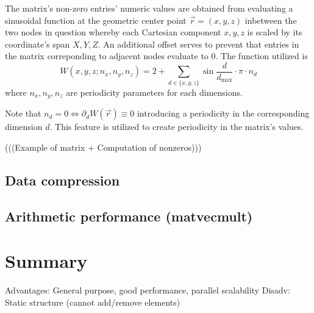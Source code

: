 \documentclass{article}
\begin{document}
    The matrix's non-zero entries' numeric values are obtained from evaluating a sinusoidal function at the geometric
    center point $\vec{r} = (x, y, z)$ inbetween the two nodes in question whereby each Cartesian component $x, y, z$ is
    scaled by its coordinate's span $X, Y, Z$. An additional offset serves to prevent that entries in the matrix
    correponding to adjacent nodes evaluate to 0. The function utilized is
    $$W(x,y,z; n_x, n_y, n_z) = 2 + \sum \limits_{d \in \{x,y,z\}} \sin{\frac{d}{d_{\text{max}}} \cdot \pi \cdot n_d} $$
    where $n_x, n_y, n_z$ are periodicity parameters for each dimensions.

    Note that $n_d = 0 \Leftrightarrow \partial_d W(\vec{r}) \equiv 0$ introducing a periodicity in the corresponding
    dimension $d$. This feature is utilized to create periodicity in the matrix's values.

    (((Example of matrix + Computation of nonzeros)))

  \subsection{Data compression}

  \subsection{Arithmetic performance (matvecmult)}

\section{Summary}
  Advantages: General purpose, good performance, parallel scalability
  Disadv: Static structure (cannot add/remove elements)

\printbibliography
\end{document}
